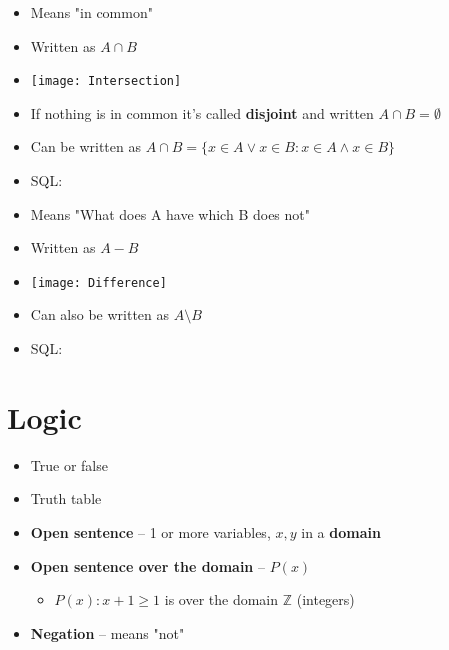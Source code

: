 \documentclass[english,10pt,a4paper]{article}
\begin{document}
\begin{theo}[Intersection] 
\begin{itemize}
\item Means "in common"
\item Written as $A \cap B$
\item[] \texttt{[image: Intersection]} 
\item If nothing is in common it's called \textbf{disjoint} and written $A \cap B = \emptyset$
\item Can be written as $A \cap B = \{ x \in A \vee x \in B : x \in A \wedge x \in B \}$
\item SQL: \\
\end{itemize}

\end{theo}



\begin{theo}[Difference] 
\begin{itemize}
\item Means "What does A have which B does not"
\item Written as $A - B$
\item[] \texttt{[image: Difference]} 
\item Can also be written as $A \setminus B $
\item SQL: \\
\end{itemize}

\end{theo}



\newpage
\section{Logic}
\begin{theo}[Basic] 
\begin{itemize}
\item True or false
\item Truth table
\item \textbf{Open sentence} -- 1 or more variables, $x,y$ in a \textbf{domain}
\item \textbf{Open sentence over the domain} -- $P(x)$
\begin{itemize}
\item $P(x): x+1 \geq 1$ is over the domain $\mathbb{Z}$ (integers)
\end{itemize}
\item \textbf{Negation} -- means "not"
\end{itemize}
\end{theo}
\end{document}
